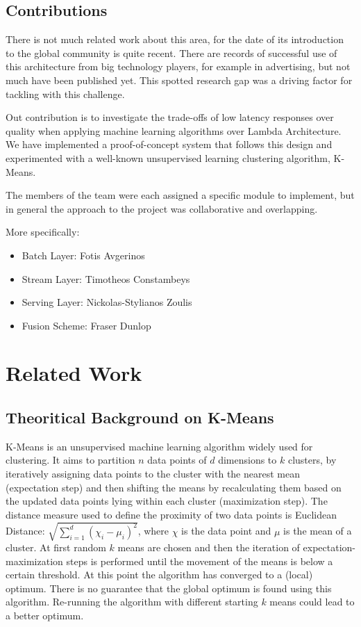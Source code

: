 \documentclass{lmproj}
\begin{document}
\section{Contributions}
\label{intro}

There is not much related work about this area, for the date of its introduction to the global community is quite recent. There are records of successful use of this architecture from big technology players, for example in advertising, but not much have been published yet. This spotted research gap was a driving factor for tackling with this challenge.

Out contribution is to investigate the trade-offs of low latency responses over quality when applying machine learning algorithms over Lambda Architecture. We have implemented a proof-of-concept system that follows this design and experimented with a well-known unsupervised learning clustering algorithm, K-Means. 

The members of the team were each assigned a specific module to implement, but in general the approach to the project was collaborative and overlapping. 

More specifically:
\begin{itemize}
	\item Batch Layer: Fotis Avgerinos
	\item Stream Layer: Timotheos Constambeys
	\item Serving Layer: Nickolas-Stylianos Zoulis
	\item Fusion Scheme: Fraser Dunlop
\end{itemize}


\chapter{Related Work}
\label{relatedwork}

\section{Theoritical Background on K-Means}
\label{relatedwork}

K-Means is an unsupervised machine learning algorithm widely used for clustering. It aims to partition $n$ data points of $d$ dimensions to $k$ clusters, by iteratively assigning data points to the cluster with the nearest mean (expectation step) and then shifting the means by recalculating them based on the updated data points lying within each cluster (maximization step). The distance measure used to define the proximity of two data points is Euclidean Distance: $\sqrt{\sum_{i=1}^{d} ({\chi_i - \mu_i})^2}$, where $\chi$ is the data point and  $\mu$ is the mean of a cluster. At first random $k$ means are chosen and then the iteration of expectation-maximization steps is performed until the movement of the means is below a certain threshold. At this point the algorithm has converged to a (local) optimum. There is no guarantee that the global optimum is found using this algorithm. Re-running the algorithm with different starting $k$ means could lead to a better optimum.
\end{document}
